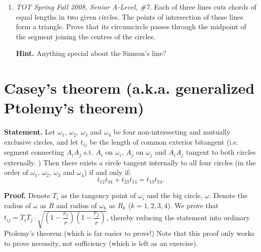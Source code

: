 \documentclass[11pt,a4paper]{article}
\begin{document}
\begin {enumerate}
Obviously $E$ is the circumcenter of triangle $CFG$. If we denote $P$ as the midpoint of $CF$ and $Q$ the midpoint of $CG$, then $EP\perp CD$ and $EQ\perp BC$. Notice also that $PQ\parallel\ell$. Let the perpendicular from $E$ to $BD$ intersect at $R$, then $P,Q,R$ are collinear by Simson's theorem. 

Let $\ell$ intersect $BD$ at $X$, and let the line parallel to $\ell$, passing through $C$ intersect $BD$ at $Z$. Now $PQ\parallel\ell$ implies $R$ is the midpoint of $XZ$. But since $ABCD$ is a parallelogram, $X$ and $Z$ are the reflections of each other in the midpoint of $BD$. (Proof: triangles $ABD$ and $CDB$ are congruent, so the triangles in the following pairs are also congruent: \{$ADX, CBZ$\},\{$ABX,CDZ$\}.) This implies that $R$ is the midpoint of $BD$ and since $ER\perp BD$, $EB=ED$ and from the fact that $E$ lies on the circumcircle of $CBD$ we know that $EC$ is the external angle bisector of $\angle BCD$. This implies that $CF=CG$, so $\angle DAF=\angle FGC=\angle GFC=\angle GAB$. (elegant, no?) $\blacksquare$


\item\emph{TOT Spring Fall 2008, Senior A-Level, \#7.} Each of three lines cuts chords of equal lengths in two given circles.  The points of intersection of these lines form a triangle.  Prove that its circumcircle passes through the midpoint of the
segment joining the centres of the circles.

\textbf {Hint.} Anything special about the Simson's line?

\end{enumerate}

\section {Casey's theorem (a.k.a. generalized Ptolemy's theorem)}

\textbf {Statement.} Let $\omega_1$, $\omega_2$, $\omega_3$ and $\omega_4$ be four non-intersecting and mutually exclusive circles, and let $t_{ij}$ be the length of common exterior bitangent (i.e. segment connecting $A_iA_j$ s.t. $A_i$ on $\omega_i$, $A_j$ on $\omega_j$ and $A_iA_j$ tangent to both circles externally. ) Then there exists a circle tangent internally to all four circles (in the order of $\omega_1$, $\omega_2$, $\omega_3$ and $\omega_4$) if and only if:
$$t_{12}t_{34}+t_{23}t_{14}=t_{13}t_{24}.$$

\textbf {Proof.} Denote $T_i$ as the tangency point of $\omega_i$ and the big circle, $\omega$. Denote the radius of $\omega$ as $R$ and radius of $\omega_k$ as $R_k$ ($k=1,2,3,4$). We prove that 
$t_{ij}=T_iT_j\cdot \sqrt{ ( 1-\dfrac{r_i}{r} ) (1-\dfrac{r_j}{r} ) }$, thereby reducing the statement into ordinary Ptolemy's theorem (which is far easier to prove!) Note that this proof only works to prove necessity, not sufficiency (which is left as an exercise).
\end{document}
